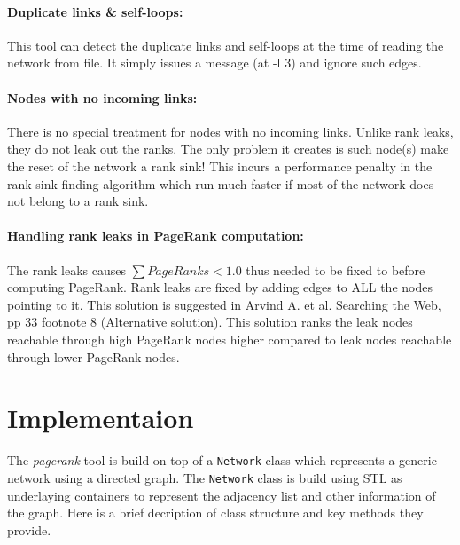 \documentclass[10pt]{article}
\begin{document}
\paragraph{Duplicate links \& self-loops:} 
This tool can detect the duplicate links and self-loops at the time of reading the
network from file. It simply issues a message (at -l 3) and ignore such edges.

\paragraph{Nodes with no incoming links:}
There is no special treatment for nodes with no incoming links. Unlike rank leaks, they do not leak
out the ranks. The only problem it creates is such node(s) make the reset of the network a rank
sink! This incurs a performance penalty in the rank sink finding algorithm which run much faster
if most of the network does not belong to a rank sink.

\paragraph{Handling rank leaks in PageRank computation:} 
The rank leaks causes $\sum PageRanks < 1.0 $ thus needed to be fixed to before computing PageRank. 
Rank leaks are fixed by adding edges to ALL the nodes pointing to it. This solution is suggested
in Arvind A. et al. Searching the Web, pp 33 footnote 8 (Alternative solution).
This solution ranks the leak nodes reachable through high PageRank nodes higher compared to leak
nodes reachable through lower PageRank nodes.

\section{Implementaion}
The \emph{pagerank} tool is build on top of a \texttt{Network} class which represents a generic
network using a directed graph. The \texttt{Network} class is build using STL as
underlaying containers to represent the adjacency list and other information of the graph. Here 
is a brief decription of class structure and key methods they provide.
\end{document}
